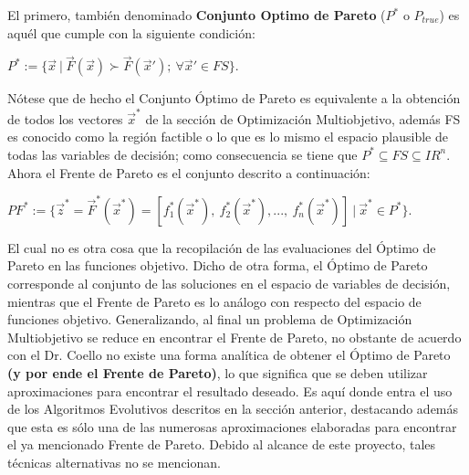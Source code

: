 \documentclass[class=report, crop=false]{standalone}
\begin{document}
El primero, también denominado \textbf{Conjunto Optimo de Pareto} 
($P^{*}$ o $P_{true}$) es aquél que cumple con la siguiente condición:\medskip\break
\centerline{$P^{*} := \{ \vec{x}\ |\ \vec{F}(\vec{x}) \succ \vec{F}(\vec{x}');\ \forall \vec{x}' \in FS \}$.}\medskip\break
Nótese que de hecho el Conjunto Óptimo de Pareto es equivalente 
a la obtención de todos los vectores $\vec{x}^{*}$ de la sección de 
Optimización Multiobjetivo, además FS es conocido como la región 
factible o lo que es lo mismo el espacio plausible de todas las 
variables de decisión; como consecuencia se tiene que $P^{*} \subseteq FS \subseteq IR^{n}$.\medskip\break
Ahora el Frente de Pareto es el conjunto descrito a continuación:\medskip\break
\centerline{$PF^{*} := \{ \vec{z}^{*} = \vec{F}^{*}(\vec{x}^{*}) = [f_1^{*}(\vec{x}^{*}),\ f_2^{*}(\vec{x}^{*}), ...,\ f_n^{*}(\vec{x}^{*})]\ |\ \vec{x}^{*} \in P^{*} \}$.}\medskip\break
El cual no es otra cosa que la recopilación de las evaluaciones 
del Óptimo de Pareto en las funciones objetivo.\break
Dicho de otra forma, el Óptimo de Pareto corresponde al conjunto 
de las soluciones en el espacio de variables de decisión, mientras 
que el Frente de Pareto es lo análogo con respecto del espacio de 
funciones objetivo.\medskip\break
Generalizando, al final un problema de Optimización Multiobjetivo 
se reduce en encontrar el Frente de Pareto, no obstante de acuerdo 
con el Dr. Coello \cite{b5} no existe una forma analítica de obtener 
el Óptimo de Pareto \textbf{(y por ende el Frente de Pareto)}, lo 
que significa que se deben utilizar aproximaciones para encontrar 
el resultado deseado.\break
Es aquí donde entra el uso de los Algoritmos Evolutivos descritos en 
la sección anterior, destacando además que esta es sólo una de las 
numerosas aproximaciones elaboradas \cite{b6} para encontrar el ya 
mencionado Frente de Pareto.\break
Debido al alcance de este proyecto, tales técnicas alternativas no 
se mencionan.

\end{document}
